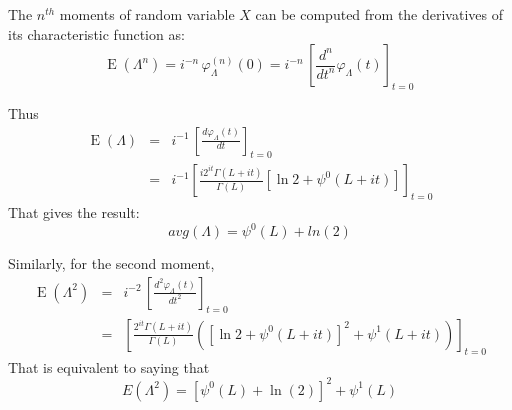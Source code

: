 \documentclass[journal]{IEEEtran}
\begin{document}
The $n^{th}$ moments of random variable $X$ can be computed from the derivatives of its characteristic function as:
\begin{equation}
\operatorname{E}\left(\Lambda^n\right) = i^{-n}\, \varphi_\Lambda^{(n)}(0)
  = i^{-n}\, \left[\frac{d^n}{dt^n} \varphi_\Lambda(t)\right]_{t=0} \,\!
\end{equation}

Thus
\begin{eqnarray*}
 \operatorname{E}\left(\Lambda\right) &=& i^{-1}\, \left[\frac{d\varphi_\Lambda(t)}{dt} \right]_{t=0} \,\! \\
  &=& i^{-1} \left[ \frac{i 2^{it} \Gamma(L+it)}{\Gamma(L)} \left[ \ln{2} + \psi^0(L+it) \right] \right]_{t=0}
\end{eqnarray*}
That gives the result:
\begin{equation}
  avg(\Lambda) = \psi^0(L) + ln(2)
\end{equation}

Similarly, for the second moment,
\begin{eqnarray*}
 \operatorname{E}\left(\Lambda^2\right) &=& i^{-2}\, \left[\frac{d^2\varphi_\Lambda(t)}{dt^2} \right]_{t=0} \,\! \\
  &=& \left[ \frac{2^{it} \Gamma(L+it)}{\Gamma(L)} \left( \left[ \ln{2} + \psi^0(L+it) \right] ^ 2 + \psi^1(L+it) \right) \right]_{t=0}  
\end{eqnarray*}
That is equivalent to saying that
\begin{equation}
  E(\Lambda^2) = \left[ \psi^0(L)+\ln(2) \right]^2 + \psi^1(L)
\end{equation}
\end{document}
